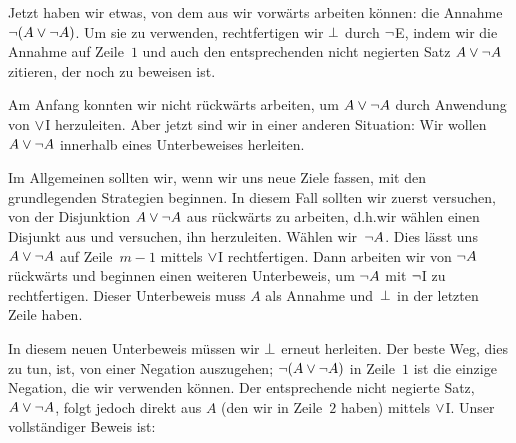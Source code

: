 \begin{fitchproof}
	\open
	\ellipsesline
	\close
\end{fitchproof}
Jetzt haben wir etwas, von dem aus wir vorwärts arbeiten können: die Annahme $\neg(A \vee \neg A)$. Um sie zu verwenden, rechtfertigen wir $\bot$ durch $\neg$E, indem wir die Annahme auf Zeile~$1$ und auch den entsprechenden nicht negierten Satz $A \vee \neg A$ zitieren, der noch zu beweisen ist.
\begin{fitchproof}
	\open
	\ellipsesline
	\close
\end{fitchproof}
Am Anfang konnten wir nicht rückwärts arbeiten, um $A \vee\neg A$ durch Anwendung von $\vee$I herzuleiten. Aber jetzt sind wir in einer anderen Situation: Wir wollen $A \vee\neg A$ innerhalb eines Unterbeweises herleiten. 

Im Allgemeinen sollten wir, wenn wir uns neue Ziele fassen, mit den grundlegenden Strategien beginnen. In diesem Fall sollten wir zuerst versuchen, von der Disjunktion $A \vee \neg A$ aus rückwärts zu arbeiten, d.h.\@ wir wählen einen Disjunkt aus und versuchen, ihn herzuleiten. Wählen wir~$\neg A$. Dies lässt uns $A \vee \neg A$ auf Zeile~$m - 1$ mittels $\vee$I rechtfertigen. Dann arbeiten wir von $\neg A$ rückwärts und beginnen einen weiteren Unterbeweis, um $\neg A$ mit $\neg$I zu rechtfertigen. Dieser Unterbeweis muss $A$ als Annahme und~$\bot$ in der letzten Zeile haben.
\begin{fitchproof}
	\open
	\open
	\ellipsesline
	\close
	\close
\end{fitchproof}
In diesem neuen Unterbeweis müssen wir $\bot$ erneut herleiten. Der beste Weg, dies zu tun, ist, von einer Negation auszugehen; $\neg(A \vee \neg A)$ in Zeile~$1$ ist die einzige Negation, die wir verwenden können. Der entsprechende nicht negierte Satz, $A \vee \neg A$, folgt jedoch direkt aus $A$ (den wir in Zeile~$2$ haben) mittels $\vee$I. Unser vollständiger Beweis ist:
\begin{fitchproof}
	\open
	\open
	\close
	\close
\end{fitchproof}

